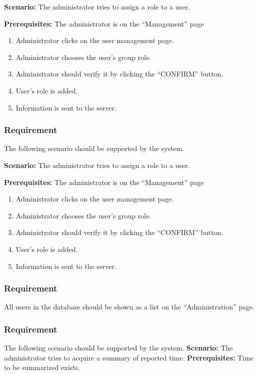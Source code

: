 \documentclass{article}
\begin{document}
\textbf{Scenario:} The administrator tries to assign a role to a user.

\textbf{Prerequisites:} The administrator is on the “Management” page

\begin{enumerate}
    \item Administrator clicks on the user management page.
    \item Administrator chooses the user’s group role.
    \item Administrator should verify it by clicking the “CONFIRM” button.
    \item User’s role is added.
    \item Information is sent to the server.
\end{enumerate}

\subsubsection{Requirement}
The following scenario should be supported by the system.

\textbf{Scenario:} The administrator tries to assign a role to a user.

\textbf{Prerequisites:} The administrator is on the “Management” page

\begin{enumerate}
    \item Administrator clicks on the user management page.
    \item Administrator chooses the user’s group role.
    \item Administrator should verify it by clicking the “CONFIRM” button.
    \item User’s role is added.
    \item Information is sent to the server.
\end{enumerate}

\subsubsection{Requirement}
All users in the database should be shown as a list on the “Administration” page.

\subsubsection{Requirement}
The following scenario should be supported by the system.
\textbf{Scenario:} The administrator tries to acquire a summary of reported time.
\textbf{Prerequisites:} Time to be summarized exists.
\end{document}
